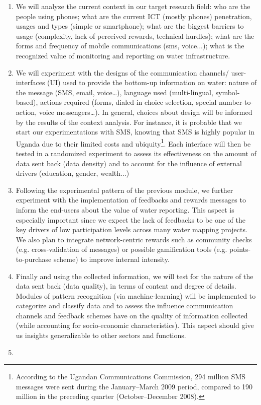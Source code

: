 \documentclass[11pt]{article}
\begin{document}
\begin{enumerate}
\item
We will analyze the current context in our target research field: who are the people using phones; what are the current ICT (mostly phones) penetration, usages and types (simple or smartphone); what are the biggest barriers to usage (complexity, lack of perceived rewards, technical hurdles); what are the forms and frequency of mobile communications (sms, voice...); what is the recognized value of monitoring and reporting on water infrastructure.
\item
We will experiment with the designs of the communication channels/ user-interfaces (UI) used to provide the bottom-up information on water: nature of the message (SMS, email, voice…), language used (multi-lingual, symbol-based), actions required (forms, dialed-in choice selection, special number-to-action, voice messengers…). In general, choices about design will be informed by the results of the context analysis. For instance, it is probable that we start our experimentations with SMS, knowing that SMS is highly popular in Uganda due to their limited costs and ubiquity\footnote{According to the Ugandan Communications Commission, 294 million SMS messages were sent during the January–March 2009 period, compared to 190 million in the preceding quarter (October–December 2008).}.
Each interface will then be tested in a randomized experiment to assess its effectiveness on the amount of data sent back (data density) and to account for the influence of external drivers (education, gender, wealth...)
\item
Following the experimental pattern of the previous module, we further experiment with the implementation of feedbacks and rewards messages to inform the end-users about the value of water reporting. 
This aspect is especially important since we expect the lack of feedbacks to be one of the key drivers of low participation levels across many water mapping projects.
We also plan to integrate network-centric rewards such as community checks (e.g. cross-validation of messages) or possible gamification tools (e.g. points-to-purchase scheme) to improve internal intensity. 
\item
Finally and using the collected information, we will test for the nature of the data sent back (data quality), in terms of content and degree of details. Modules of pattern recognition (via machine-learning) will be implemented to categorize and classify data and to assess the influence communication channels and feedback schemes have on the quality of information collected (while accounting for socio-economic characteristics). This aspect should give us insights generalizable to other sectors and functions.
\item
\end{enumerate}  
\end{document}

